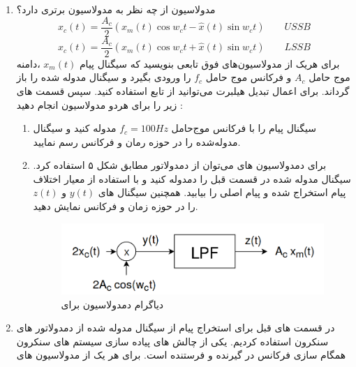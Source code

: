 \documentclass[14pt, professionalfont]{article}
\begin{document}
\begin{enumerate}
\begin{enumerate}
	\end{enumerate}
	\pagebreak
		\item
		مدولاسیون 
		\:
		\:
		از چه نظر به مدولاسیون 
		\:
		\:
		برتری دارد؟
		\begin{equation*}
			x_c(t) = \frac{A_c}{2} \left(x_m(t)\cos w_c t - \hat{x}(t)\sin w_ct\right) \qquad USSB
		\end{equation*}
		\begin{equation*}
		x_c(t) = \frac{A_c}{2} \left(x_m(t)\cos w_c t + \hat{x}(t)\sin w_ct\right) \qquad LSSB
		\end{equation*}
		برای هر‌یک از مدولاسیون‌های فوق تابعی بنویسید که سیگنال پیام 
		\:
		$x_m(t)$
		\:
		،دامنه موج حامل 
		\:
		$A_c$
		\:
		و فرکانس موج حامل 
		\:
		$f_c$
		\:
		را ورودی بگیرد و سیگنال مدوله شده را باز گرداند. برای اعمال تبدیل هیلبرت می‌توانید از تابع 
		\:
		\:
		استفاده کنید. 
		 سپس قسمت های زیر را برای هر‌دو مدولاسیون انجام دهید :
		\begin{enumerate}
			\item 
			سیگنال پیام را با فرکانس موج‌حامل 
			\:
			$f_c = 100Hz$
			\:
			مدوله کنید و سیگنال مدوله‌شده را در حوزه رمان و فرکانس رسم نمایید.
			\item
			برای دمدولاسیون های 
			\:
			\:
			می‌توان از دمدولاتور 
			\:
			\:
			مطابق شکل ۵ استفاده کرد. سیگنال مدوله شده در قسمت قبل را دمدوله کنید و با استفاده از معیار 
			\:
			\:
			اختلاف پیام استخراج شده و پیام اصلی را بیابید. همچنین سیگنال های 
			\:
			$y(t)$
			\:
			و
			\:
			$z(t)$
			\:
			را در حوزه زمان و فرکانس نمایش دهید.
			\begin{figure}[h]
				\centering
				\includegraphics[scale = 0.25]{../images/ssbdemod.png}
				\caption{
					دیاگرام دمدولاسیون برای 
				}
			\end{figure}
		\end{enumerate}
	\item 
	در قسمت های قبل برای استخراج پیام از سیگنال مدوله شده از دمدولاتور های سنکرون استفاده کردیم. یکی از چالش های پیاده سازی سیستم های سنکرون همگام سازی فرکانس در گیرنده و فرستنده است.  برای هر یک از مدولاسیون های 

\end{enumerate}
\end{document}
